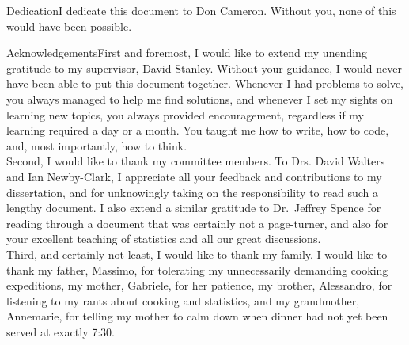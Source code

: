 \documentclass[
12pt, %
twoside,
english]{guelphthesis}
\let\cleardoublepage\clearpage
\renewcommand{\headrulewidth}{0pt}
\renewcommand{\headrulewidth}{0pt}
\begin{document}
  \cleardoublepage
  \begin{preambleItem}{2}{Dedication}{I dedicate this document to Don Cameron. Without you, none of this would have been possible.}
  \end{preambleItem}
  \cleardoublepage
   \begin{preambleItem}{2}{Acknowledgements}{First and foremost, I would like to extend my unending gratitude to my supervisor, David Stanley. Without your guidance, I would never have been able to put this document together. Whenever I had problems to solve, you always managed to help me find solutions, and whenever I set my sights on learning new topics, you always provided encouragement, regardless if my learning required a day or a month. You taught me how to write, how to code, and, most importantly, how to think.\\
\indent Second, I would like to thank my committee members. To Drs. David Walters and Ian Newby-Clark, I appreciate all your feedback and contributions to my dissertation, and for unknowingly taking on the responsibility to read such a lengthy document. I also extend a similar gratitude to Dr.~Jeffrey Spence for reading through a document that was certainly not a page-turner, and also for your excellent teaching of statistics and all our great discussions.\\
\indent Third, and certainly not least, I would like to thank my family. I would like to thank my father, Massimo, for tolerating my unnecessarily demanding cooking expeditions, my mother, Gabriele, for her patience, my brother, Alessandro, for listening to my rants about cooking and statistics, and my grandmother, Annemarie, for telling my mother to calm down when dinner had not yet been served at exactly 7:30.}
  \end{preambleItem}


\fancypagestyle{plain}{%
  \fancyhf{}%
  \renewcommand{\headrulewidth}{0pt}
  \fancyhead[R]{\thepage}

   }

  \cleardoublepage
  \hypersetup{linkcolor = black, pdfborder= 0 0 0} %
  \setcounter{secnumdepth}{5}
  \setcounter{tocdepth}{5}
  \tableofcontents
  \newpage

  \cleardoublepage
  \listoftables
  \newpage
\end{document}
